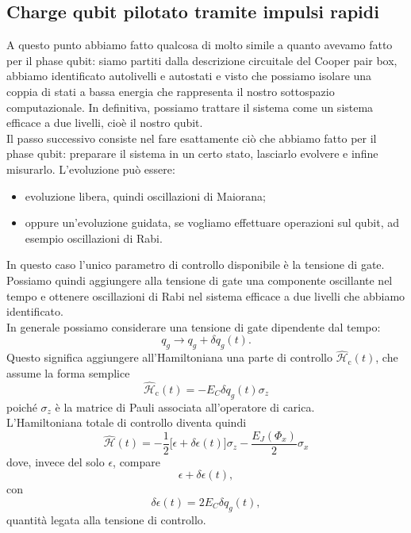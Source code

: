 \subsection{Charge qubit pilotato tramite impulsi rapidi}
A questo punto abbiamo fatto qualcosa di molto simile a quanto avevamo fatto per il phase qubit: siamo partiti dalla descrizione circuitale del Cooper pair box, abbiamo identificato autolivelli e autostati e visto che possiamo isolare una coppia di stati a bassa energia che rappresenta il nostro sottospazio computazionale. In definitiva, possiamo trattare il sistema come un sistema efficace a due livelli, cioè il nostro qubit.\\
Il passo successivo consiste nel fare esattamente ciò che abbiamo fatto per il phase qubit: preparare il sistema in un certo stato, lasciarlo evolvere e infine misurarlo. L'evoluzione può essere:
\begin{itemize}[leftmargin=0.5cm]
    \item evoluzione libera, quindi oscillazioni di Maiorana;
    \item oppure un'evoluzione guidata, se vogliamo effettuare operazioni sul qubit, ad esempio oscillazioni di Rabi.
\end{itemize}
In questo caso l'unico parametro di controllo disponibile è la tensione di gate. Possiamo quindi aggiungere alla tensione di gate una componente oscillante nel tempo e ottenere oscillazioni di Rabi nel sistema efficace a due livelli che abbiamo identificato.\\
In generale possiamo considerare una tensione di gate dipendente dal tempo:
\[
q_g \to q_g + \delta q_g(t).
\]
Questo significa aggiungere all'Hamiltoniana una parte di controllo $\hat{\mathcal{H}}_{\text{c}}(t)$, che assume la forma semplice
\begin{equation*}
    \hat{\mathcal{H}}_{\text{c}}(t)
    =
    -E_C \delta q_g(t)\sigma_z
\end{equation*}
poiché $\sigma_z$ è la matrice di Pauli associata all'operatore di carica.\\
L'Hamiltoniana totale di controllo diventa quindi
\begin{equation*}
    \hat{\mathcal{H}}(t)
    =
    -\frac{1}{2}
    \bigl[
        \epsilon + \delta\epsilon(t)
    \bigr]
    \sigma_z
    -
    \frac{E_J(\Phi_x)}{2}\sigma_x
\end{equation*}
dove, invece del solo $\epsilon$, compare
\[
\epsilon + \delta\epsilon(t),
\]
con
\[
\delta\epsilon(t)=2E_C\delta q_g(t),
\]
quantità legata alla tensione di controllo.\\
